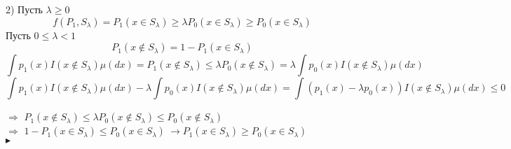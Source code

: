 \documentclass{article}
\begin{document}
2) Пусть $\lambda\geq 0$
$$ f(P_1,S_\lambda) = P_1(x\in S_\lambda) \geq \lambda P_0(x\in S_\lambda)\geq P_0(x\in S_\lambda)$$
Пусть $0\leq\lambda<1$\\
$$P_1(x\notin S_\lambda) = 1 - P_1(x\in S_\lambda)$$
$$\int{p_1(x)I(x\notin S_\lambda)\mu(dx)} = P_1(x\notin S_\lambda)\leq\lambda P_0(x\notin S_\lambda) = \lambda\int{p_0(x)I(x\notin S_\lambda)\mu(dx)}$$
$$\int{p_1(x)I(x\notin S_\lambda)\mu(dx)} - \lambda\int{p_0(x)I(x\notin S_\lambda)\mu(dx)} = 
 \int{(p_1(x) - \lambda p_0(x))I(x\notin S_\lambda)\mu(dx)} \leq 0$$

$\Rightarrow$ $P_1(x\notin S_\lambda)\leq\lambda P_0(x\notin S_\lambda)\leq P_0(x\notin S_\lambda)$\\
$\Rightarrow$ $1 - P_1(x\in S_\lambda)\leq P_0(x\in S_\lambda)\ \rightarrow P_1(x\in S_\lambda)\geq P_0(x\in S_\lambda)$\\
$\blacktriangleright$\\ 
\end{document}
